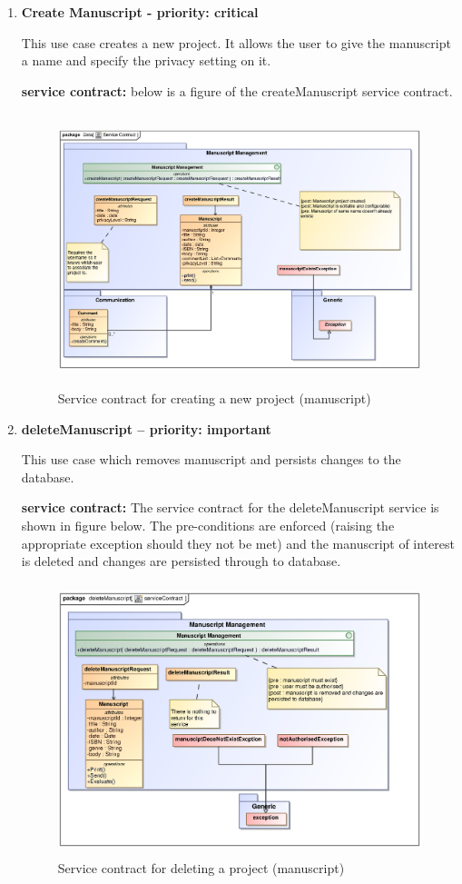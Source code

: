 \documentclass[12pt]{article}
\begin{document}
\begin{enumerate}
\item \textbf{Create Manuscript - priority: critical}\\
\par{This use case creates a new project. It allows the user to give the manuscript a name and specify the privacy setting on it. }

\textbf{service contract:} below is a figure of the createManuscript service contract.

\begin{figure}[h]
\includegraphics[height=300px, width=500px]{epsImages/ManuscriptManagement/createManuscriptServiceContract.eps}
\caption{Service contract for creating a new project (manuscript)}
\end{figure}


\item \textbf{deleteManuscript – priority: important}\\
\par{This use case which removes manuscript and persists changes to the database. }

\par{\textbf{service contract:} 
The service contract for the deleteManuscript  service is shown in figure below. The pre-conditions are enforced (raising the appropriate exception should they not be met) and the manuscript of interest is deleted and changes are persisted through to database.}

\begin{figure}[h]
\includegraphics[height=300px, width=500px]{epsImages/ManuscriptManagement/deleteManuscript.eps}
\caption{Service contract for deleting a  project (manuscript)}
\end{figure}


\end{enumerate}
\end{document}
